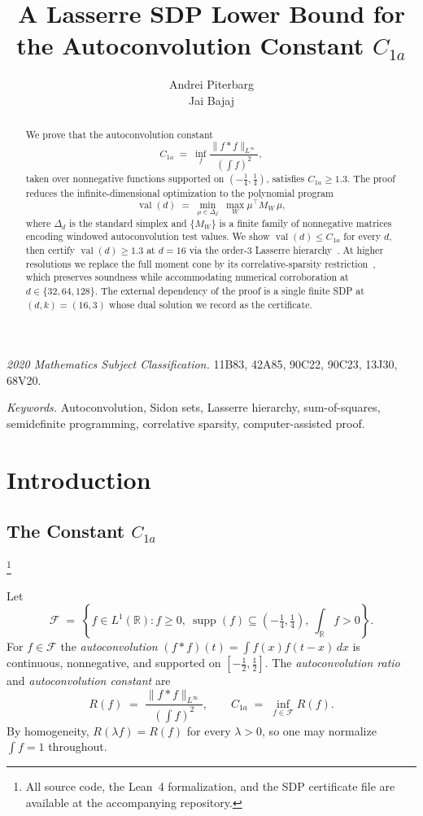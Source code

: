 \documentclass[11pt, letterpaper]{article}
\title{\texorpdfstring{%
  \bfseries A Lasserre SDP Lower Bound for the Autoconvolution Constant $C_{1a}$
}{A Lasserre SDP Lower Bound for the Autoconvolution Constant C1a}}
\author{Andrei Piterbarg \\ Jai Bajaj}
\date{}
\theoremstyle{paperplain}
\theoremstyle{paperdef}
\newcommand{\R}{\mathbb{R}}
\newcommand{\supp}{\operatorname{supp}}
\newcommand{\val}{\operatorname{val}}
\begin{document}
\maketitle

\begin{abstract}
We prove that the autoconvolution constant
\[
  C_{1a}
  \;=\;
  \inf_f \frac{\|f*f\|_{L^\infty}}{\left(\int f\right)^2},
\]
taken over nonnegative functions supported on $(-\tfrac14,\tfrac14)$,
satisfies $C_{1a}\ge 1.3$.  The proof reduces the infinite-dimensional
optimization to the polynomial program
\[
  \val(d)
  \;=\;
  \min_{\mu \in \Delta_d}\;\max_W \mu^\top M_W\,\mu,
\]
where $\Delta_d$ is the standard simplex and $\{M_W\}$ is a finite
family of nonnegative matrices encoding windowed autoconvolution test
values.  We show $\val(d) \le C_{1a}$ for every $d$, then certify
$\val(d)\ge 1.3$ at $d=16$ via the order-$3$ Lasserre
hierarchy~\cite{Lasserre2001}.  At higher resolutions we replace
the full moment cone by its correlative-sparsity
restriction~\cite{Waki2006}, which preserves soundness while
accommodating numerical corroboration at $d\in\{32,64,128\}$.  The
external dependency of the proof is a single finite SDP at
$(d,k)=(16,3)$ whose dual solution we record as the certificate.
\end{abstract}
\noindent\textit{2020 Mathematics Subject Classification.}
11B83, 42A85, 90C22, 90C23, 13J30, 68V20.

\smallskip

\noindent\textit{Keywords.}
Autoconvolution, Sidon sets, Lasserre hierarchy, sum-of-squares,
semidefinite programming, correlative sparsity, computer-assisted
proof.

\medskip

\section{Introduction}\label{sec:intro}

\subsection{The Constant \texorpdfstring{$C_{1a}$}{C1a}}\footnote{All
  source code, the Lean~4 formalization, and the SDP certificate file
  are available at the accompanying repository.}

Let
\[
  \mathcal{F}
  \;=\;
  \left\{
    f \in L^1(\R) :
    f \ge 0,\
    \supp(f) \subseteq \left(-\tfrac14,\tfrac14\right),\
    \int_{\R} f > 0
  \right\}.
\]
For $f\in\mathcal{F}$ the \emph{autoconvolution} $(f*f)(t) =
\int f(x)f(t-x)\,dx$ is continuous, nonnegative, and supported on
$[-\tfrac12,\tfrac12]$.  The \emph{autoconvolution ratio} and
\emph{autoconvolution constant} are
\[
  R(f) \;=\; \frac{\|f*f\|_{L^\infty}}{\left(\int f\right)^2},
  \qquad
  C_{1a} \;=\; \inf_{f \in \mathcal{F}} R(f).
\]
By homogeneity, $R(\lambda f) = R(f)$ for every $\lambda>0$, so one may
normalize $\int f = 1$ throughout.
\end{document}
